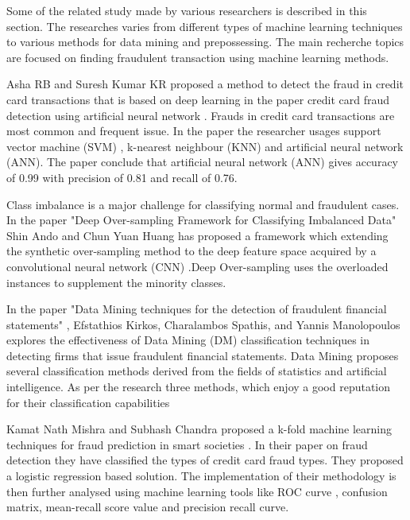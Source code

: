 
Some of the related study made by various researchers is described in this section. The researches varies from different types of machine learning techniques to various methods for data mining and prepossessing. The main recherche topics are focused on finding fraudulent transaction using machine learning methods. 


Asha RB and Suresh Kumar KR proposed a method to detect the fraud in credit card transactions that is based on deep learning \cite{GoodBengCour16} in the paper credit card fraud detection using artificial neural network \cite{RB2021}. Frauds in credit card transactions are most common and frequent issue. In the paper the researcher usages support vector machine (SVM) \cite{Cristianini2008}, k-nearest neighbour (KNN) \cite{Mucherino2009} and artificial neural network (ANN). The paper conclude that artificial neural network (ANN) gives accuracy of 0.99 with precision of 0.81 and recall of 0.76.


Class imbalance is a major challenge for classifying normal and fraudulent cases. In the paper "Deep Over-sampling Framework for Classifying Imbalanced Data" \cite{ando2017deep} Shin Ando and Chun Yuan Huang has proposed a framework which extending the synthetic over-sampling method to the deep feature space acquired by a convolutional neural network (CNN) \cite{Yamashita2018}.Deep Over-sampling uses the overloaded instances to supplement the minority classes.  

In the paper "Data Mining techniques for the detection of fraudulent financial statements" \cite{KIRKOS2007995}, Efstathios Kirkos, Charalambos Spathis, and Yannis Manolopoulos explores the effectiveness of Data Mining (DM) classification techniques in detecting firms that issue fraudulent financial statements. Data Mining proposes several classification methods
derived from the fields of statistics and artificial intelligence. As per the research three methods, which enjoy a good reputation for their classification capabilities

Kamat Nath Mishra and Subhash Chandra proposed a k-fold machine learning techniques for fraud prediction in smart societies \cite{Mishra2021}. In their paper on fraud detection they have classified the types of credit card fraud types. They proposed a logistic regression based solution. The implementation of their methodology is then further analysed using machine learning tools like ROC curve \cite{FAWCETT2006861}, confusion matrix, mean-recall score value and precision recall curve. 

